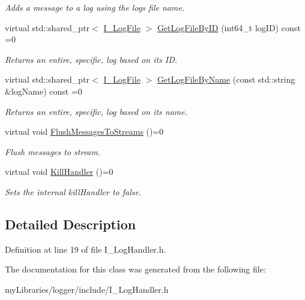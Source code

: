 \begin{DoxyCompactItemize}
\begin{DoxyCompactList}\small\item\em Adds a message to a log using the logs file name. \end{DoxyCompactList}\item 
\mbox{\label{classLoggerClasses_1_1I__LogHandler_acbcae07a24a5f379a24e26a81c04189e}} 
virtual std\+::shared\+\_\+ptr$<$ \mbox{\hyperlink{classLoggerClasses_1_1I__LogFile}{I\+\_\+\+Log\+File}} $>$ \mbox{\hyperlink{classLoggerClasses_1_1I__LogHandler_acbcae07a24a5f379a24e26a81c04189e}{Get\+Log\+File\+By\+ID}} (int64\+\_\+t log\+ID) const =0
\begin{DoxyCompactList}\small\item\em Returns an entire, specific, log based on its ID. \end{DoxyCompactList}\item 
\mbox{\label{classLoggerClasses_1_1I__LogHandler_a04149417f54199a40cc1b677df7940a3}} 
virtual std\+::shared\+\_\+ptr$<$ \mbox{\hyperlink{classLoggerClasses_1_1I__LogFile}{I\+\_\+\+Log\+File}} $>$ \mbox{\hyperlink{classLoggerClasses_1_1I__LogHandler_a04149417f54199a40cc1b677df7940a3}{Get\+Log\+File\+By\+Name}} (const std\+::string \&log\+Name) const =0
\begin{DoxyCompactList}\small\item\em Returns an entire, specific, log based on its name. \end{DoxyCompactList}\item 
\mbox{\label{classLoggerClasses_1_1I__LogHandler_a54dad8b6f0fc32bc4bb4ba52f0d378da}} 
virtual void \mbox{\hyperlink{classLoggerClasses_1_1I__LogHandler_a54dad8b6f0fc32bc4bb4ba52f0d378da}{Flush\+Messages\+To\+Streams}} ()=0
\begin{DoxyCompactList}\small\item\em Flush messages to stream. \end{DoxyCompactList}\item 
\mbox{\label{classLoggerClasses_1_1I__LogHandler_a7eba5b30d6f29d9cb8691832fd0b7c7a}} 
virtual void \mbox{\hyperlink{classLoggerClasses_1_1I__LogHandler_a7eba5b30d6f29d9cb8691832fd0b7c7a}{Kill\+Handler}} ()=0
\begin{DoxyCompactList}\small\item\em Sets the internal kill\+Handler to false. \end{DoxyCompactList}\end{DoxyCompactItemize}


\subsection{Detailed Description}


Definition at line 19 of file I\+\_\+\+Log\+Handler.\+h.



The documentation for this class was generated from the following file\+:\begin{DoxyCompactItemize}
\item 
my\+Libraries/logger/include/I\+\_\+\+Log\+Handler.\+h\end{DoxyCompactItemize}
